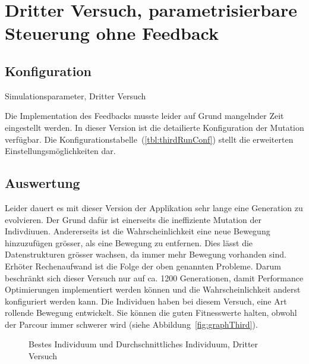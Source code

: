     \section{Dritter Versuch, parametrisierbare Steuerung ohne Feedback}

      \subsection{Konfiguration}

        \begin{table}[H]
          \centering
          
          \caption{Simulationsparameter, Dritter Versuch \label{tbl:thirdRunConf}}
        \end{table}

        Die Implementation des Feedbacks musste leider auf Grund mangelnder Zeit eingestellt werden.
        In dieser Version ist die detailierte Konfiguration der Mutation verfügbar.
        Die Konfigurationstabelle~(\vref{tbl:thirdRunConf}) stellt die erweiterten Einstellungsmöglichkeiten dar.


      \subsection{Auswertung}

        Leider dauert es mit dieser Version der Applikation sehr lange eine Generation zu evolvieren. Der Grund dafür ist einerseits die ineffiziente Mutation der Indivdiuuen.
        Andererseits ist die Wahrscheinlichkeit eine neue Bewegung hinzuzufügen grösser, als eine Bewegung zu entfernen. Dies lässt die Datenstrukturen grösser wachsen, da immer mehr Bewegung vorhanden sind.
        Erhöter Rechenaufwand ist die Folge der oben genannten Probleme.
        Darum beschränkt sich dieser Versuch nur auf ca. 1200 Generationen, damit Performance Optimierungen implementiert werden können und die Wahrscheinlichkeit anderst konfiguriert werden kann.
        Die Individuen haben bei diesem Versuch, eine Art rollende Bewegung entwickelt.
        Sie können die guten Fitnesswerte halten, obwohl der Parcour immer schwerer wird (siehe Abbildung~\vref{fig:graphThird}).

        \begin{figure}
          \centering
          
          \caption{Bestes Individuum und Durchschnittliches Individuum, Dritter Versuch\label{fig:graphThird}}
        \end{figure}

